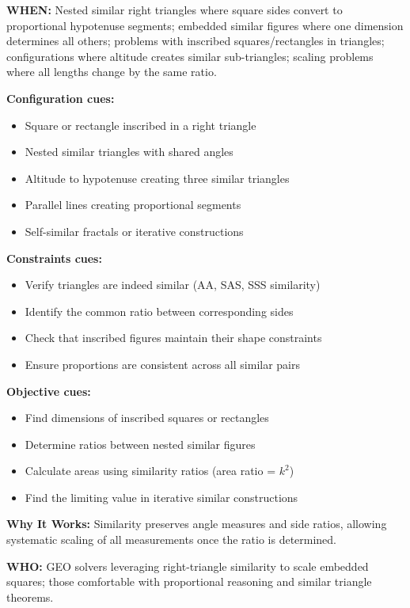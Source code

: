 \documentclass[12pt]{article}
\begin{document}
\textbf{WHEN:} Nested similar right triangles where square sides convert to proportional hypotenuse segments; embedded similar figures where one dimension determines all others; problems with inscribed squares/rectangles in triangles; configurations where altitude creates similar sub-triangles; scaling problems where all lengths change by the same ratio.

\textbf{Configuration cues:}
\begin{itemize}
    \item Square or rectangle inscribed in a right triangle
    \item Nested similar triangles with shared angles
    \item Altitude to hypotenuse creating three similar triangles
    \item Parallel lines creating proportional segments
    \item Self-similar fractals or iterative constructions
\end{itemize}

\textbf{Constraints cues:}
\begin{itemize}
    \item Verify triangles are indeed similar (AA, SAS, SSS similarity)
    \item Identify the common ratio between corresponding sides
    \item Check that inscribed figures maintain their shape constraints
    \item Ensure proportions are consistent across all similar pairs
\end{itemize}

\textbf{Objective cues:}
\begin{itemize}
    \item Find dimensions of inscribed squares or rectangles
    \item Determine ratios between nested similar figures
    \item Calculate areas using similarity ratios (area ratio = $k^2$)
    \item Find the limiting value in iterative similar constructions
\end{itemize}

\textbf{Why It Works:} Similarity preserves angle measures and side ratios, allowing systematic scaling of all measurements once the ratio is determined.

\textbf{WHO:} GEO solvers leveraging right-triangle similarity to scale embedded squares; those comfortable with proportional reasoning and similar triangle theorems.
\end{document}
